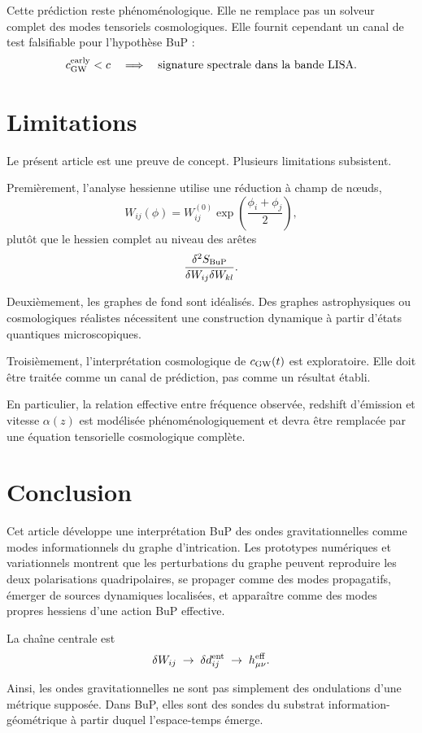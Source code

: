 \documentclass[11pt,a4paper]{article}
\begin{document}
Cette prédiction reste phénoménologique. Elle ne remplace pas un solveur complet
des modes tensoriels cosmologiques. Elle fournit cependant un canal de test
falsifiable pour l'hypothèse BuP :
\[
c_{\rm GW}^{\rm early}<c
\quad
\Longrightarrow
\quad
\text{signature spectrale dans la bande LISA}.
\]

\section{Limitations}

Le présent article est une preuve de concept. Plusieurs limitations subsistent.

Premièrement, l'analyse hessienne utilise une réduction à champ de nœuds,
\[
W_{ij}(\phi) = W_{ij}^{(0)} \exp\left(\frac{\phi_i + \phi_j}{2}\right),
\]
plutôt que le hessien complet au niveau des arêtes
\[
\frac{\delta^2 S_{\rm BuP}}{\delta W_{ij} \delta W_{kl}}.
\]

Deuxièmement, les graphes de fond sont idéalisés. Des graphes astrophysiques ou
cosmologiques réalistes nécessitent une construction dynamique à partir d'états
quantiques microscopiques.

Troisièmement, l'interprétation cosmologique de \(c_{\rm GW}(t)\) est exploratoire.
Elle doit être traitée comme un canal de prédiction, pas comme un résultat établi.

En particulier, la relation effective entre fréquence observée, redshift
d'émission et vitesse \(\alpha(z)\) est modélisée phénoménologiquement et devra
être remplacée par une équation tensorielle cosmologique complète.

\section{Conclusion}

Cet article développe une interprétation BuP des ondes gravitationnelles comme
modes informationnels du graphe d'intrication. Les prototypes numériques et
variationnels montrent que les perturbations du graphe peuvent reproduire les
deux polarisations quadripolaires, se propager comme des modes propagatifs,
émerger de sources dynamiques localisées, et apparaître comme des modes propres
hessiens d'une action BuP effective.

La chaîne centrale est
\[
\delta W_{ij}
\;\rightarrow\;
\delta d_{ij}^{\rm ent}
\;\rightarrow\;
h_{\mu\nu}^{\rm eff}.
\]

Ainsi, les ondes gravitationnelles ne sont pas simplement des ondulations d'une
métrique supposée. Dans BuP, elles sont des sondes du substrat
information-géométrique à partir duquel l'espace-temps émerge.
\end{document}
